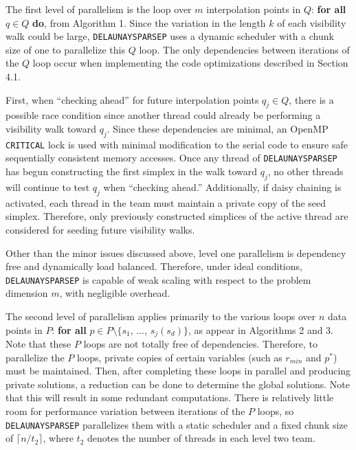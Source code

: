 {

The first level of parallelism is the loop over $m$ interpolation points
in $Q$: {\bf for all} $q \in Q$ {\bf do}, from Algorithm 1. Since
the variation in the length $k$ of each visibility walk could be large,
{\tt DELAUNAYSPARSEP} uses a dynamic scheduler with a chunk size of one
to parallelize this $Q$ loop. The only dependencies between iterations of
the $Q$ loop occur when implementing the code optimizations described in
Section 4.1.

First, when ``checking ahead'' for future interpolation points
$q_j\in Q$, there is a possible race condition since another thread
could already be performing a visibility walk toward $q_j$. Since these
dependencies are minimal, an OpenMP {\tt CRITICAL} lock is used with
minimal modification to the serial code to ensure safe sequentially
consistent memory accesses. Once any thread of {\tt DELAUNAYSPARSEP} has
begun constructing the first simplex in the walk toward $q_j$, no other
threads will continue to test $q_j$ when ``checking ahead.''
Additionally, if daisy chaining is activated, each thread in the team
must maintain a private copy of the seed simplex. Therefore, only
previously constructed simplices of the active thread are considered
for seeding future visibility walks.

Other than the minor issues discussed above, level one
parallelism is dependency free and dynamically load balanced.
Therefore, under ideal conditions, {\tt DELAUNAYSPARSEP} is capable of
weak scaling with respect to the problem dimension $m$, with negligible
overhead.


The second level of parallelism applies primarily to the various loops
over $n$ data points in $P$: {\bf for all} $p\in P \setminus \{s_1$,
$\ldots$, $s_j(s_d)\}$, as appear in Algorithms 2 and 3. Note that
these $P$ loops are not totally free of dependencies. Therefore, to
parallelize the $P$ loops, private copies of certain variables (such as
$r_{min}$ and $p^*$) must be maintained. Then, after completing these loops
in parallel and producing private solutions, a reduction can be done to
determine the global solutions. Note that this will result in some
redundant computations. There is relatively little room for performance
variation between iterations of the $P$ loops, so {\tt DELAUNAYSPARSEP}
parallelizes them with a static scheduler and a fixed chunk size of
$\lceil n/t_2 \rceil$, where $t_2$ denotes the number of threads in
each level two team.

}
